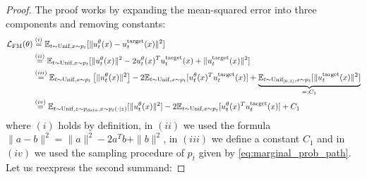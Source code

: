 \begin{proof}
The proof works by expanding the mean-squared error into three components and removing constants:
\begin{align*}
    \mathcal{L}_{\text{FM}}(\theta)&\overset{(i)}{=}\mathbb{E}_{t\sim\text{Unif},x\sim p_t}[\|u_t^\theta(x) - u^{\text{target}}_t(x)\|^2]\\
    &\overset{(ii)}{=}\mathbb{E}_{t\sim\text{Unif},x\sim p_t}[\|u_t^\theta(x)\|^2 - 2u_t^\theta(x)^Tu^{\text{target}}_t(x) + \|u^{\text{target}}_t(x)\|^2]\\
    &\overset{(iii)}{=}\mathbb{E}_{t\sim\text{Unif},x\sim p_t}\left[\|u_t^\theta(x)\|^2\right] - 2\mathbb{E}_{t\sim\text{Unif},x\sim p_t}[u_t^\theta(x)^Tu^{\text{target}}_t(x)] + \underbrace{\mathbb{E}_{t\sim\text{Unif}_{[0,1]}, x\sim p_t}[\|u^{\text{target}}_t(x)\|^2]}_{=:C_1}\\
    &\overset{(iv)}{=}\mathbb{E}_{t\sim\text{Unif},z\sim p_{\rm{data}}, x\sim p_t(\cdot|z)}[\|u_t^\theta(x)\|^2] - 2\mathbb{E}_{t\sim\text{Unif},x\sim p_t}[u_t^\theta(x)^Tu^{\text{target}}_t(x)] + C_1
\end{align*}
where $(i)$ holds by definition, in $(ii)$ we used the formula $\|a-b\|^2=\|a\|^2-2a^Tb+\|b\|^2$, in $(iii)$ we define a constant $C_1$ and in $(iv)$ we used the sampling procedure of $p_t$ given by \cref{eq:marginal_prob_path}. Let us reexpress the second summand:


\end{proof}
